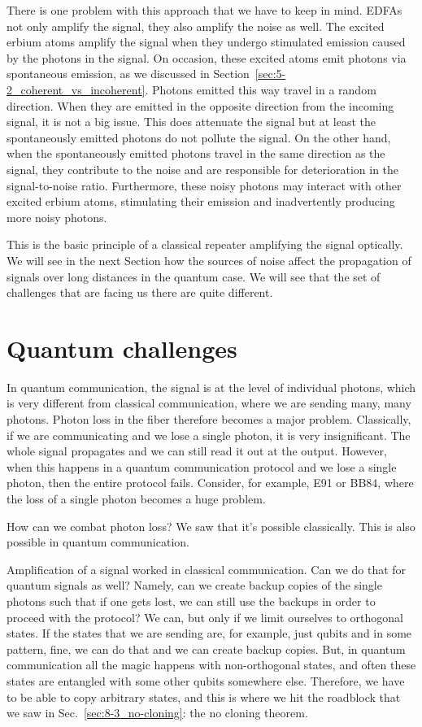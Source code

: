 There is one problem with this approach that we have to keep in mind.
EDFAs not only amplify the signal, they also amplify the noise as well.
The excited erbium atoms amplify the signal when they undergo stimulated emission caused by the photons in the signal.
On occasion, these excited atoms emit photons via spontaneous emission, as we discussed in Section~\ref{sec:5-2_coherent_vs_incoherent}.
Photons emitted this way travel in a random direction.
When they are emitted in the opposite direction from the incoming signal, it is not a big issue. This does attenuate the signal but at least the spontaneously emitted photons do not pollute the signal.
On the other hand, when the spontaneously emitted photons travel in the same direction as the signal, they contribute to the noise and are responsible for deterioration in the signal-to-noise ratio.
Furthermore, these noisy photons may interact with other excited erbium atoms, stimulating their emission and inadvertently producing more noisy photons.

This is the basic principle of a classical repeater amplifying the signal optically. We will see in the next Section how the sources of noise affect the propagation of signals over long distances in the quantum case.
We will see that the set of challenges that are facing us there are quite different.



\section{Quantum challenges}

In quantum communication, the signal is at the level of individual photons, which is very different from classical communication, where we are sending many, many photons. Photon loss in the fiber therefore becomes a major problem. Classically, if we are communicating and we lose a single photon, it is very insignificant. The whole signal propagates and we can still read it out at the output. However, when this happens in a quantum communication protocol and we lose a single photon, then the entire protocol fails. Consider, for example, E91 or BB84, where the loss of a single photon becomes a huge problem.

How can we combat photon loss? We saw that it's possible classically. This is also possible in quantum communication.

Amplification of a signal worked in classical communication. Can we do that for quantum signals as well? Namely, can we create backup copies of the single photons such that if one gets lost, we can still use the backups in order to proceed with the protocol? We can, but only if we limit ourselves to orthogonal states. If the states that we are sending are, for example, just qubits \ket{} and  in some pattern, fine, we can do that and we can create backup copies. But, in quantum communication all the magic happens with non-orthogonal states, and often these states are entangled with some other qubits somewhere else. Therefore, we have to be able to copy arbitrary states, and this is where we hit the roadblock that we saw in Sec.~\ref{sec:8-3_no-cloning}: the no cloning theorem.

